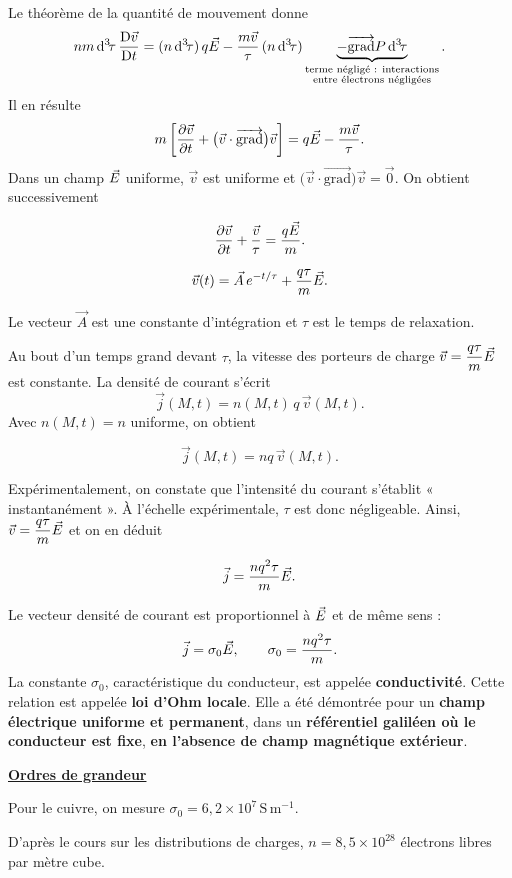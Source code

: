 \documentclass[11pt,a4paper]{article}
\newif\ifinexample
\newcommand{\dd}{\mathrm d}
\newcommand{\vv}{\vec v}
\newcommand{\grad}{\overrightarrow{\mathrm{grad}}}
\newcommand{\titr}[1]{\par\ifinexample\else\Needspace{4\baselineskip}\fi\textbf{\underline{#1}}\par\nopagebreak[3]}
\newcommand{\stars}[1]{\mathord{\star}\ifnum#1>1\mkern5mu\mathord{\star}\fi\ifnum#1>2\mkern5mu\mathord{\star}\fi\ifnum#1>3\mkern5mu\mathord{\star}\fi\ifnum#1>4\mkern5mu\mathord{\star}\fi\ifnum#1>5\mkern5mu\mathord{\star}\fi}
\newenvironment{result}[1][4]{\begin{cadre}[etoiles={\stars{#1}}]}{\end{cadre}}
\newcommand{\vj}{\vec j}\newcommand{\vE}{\vec E}\newcommand{\vB}{\vec B}
\newcommand{\vzero}{\vec 0}
\newcommand{\vol}{\dd^3\!\tau}
\newcommand{\bmath}[1]{\begin{cadre}\[#1\]\end{cadre}}
\newcommand{\unite}[1]{\,\mathrm{#1}}
\begin{document}
Le théorème de la quantité de mouvement donne
\[
 nm\,\vol\,\frac{\mathrm D\vv}{\mathrm Dt}
   =(n\,\vol)\,q\E-\frac{m\vv}{\tau}\,(n\,\vol)
     \underbrace{-\grad P\,\vol}_{\substack{\text{terme négligé : interactions}\\
                                             \text{entre électrons négligées}}}.
\]
Il en résulte
\[
 m\left[\frac{\partial\vv}{\partial t}+
       \bigl(\vv\cdot\grad\bigr)\vv\right]
    =q\E-\frac{m\vv}{\tau}.
\]
Dans un champ \(\vec E\) uniforme, \(\vv\) est uniforme et
\(\bigl(\vv\cdot\grad\bigr)\vv=\vzero\). On obtient successivement
\begin{cadre}\[\frac{\partial\vv}{\partial t}+\frac{\vv}{\tau}=\frac{q\E}{m}.\]\end{cadre}
\begin{cadre}\[\vv(t)=\vec A\,e^{-t/\tau}+\frac{q\tau}{m}\E.\]\end{cadre}
Le vecteur \(\vec A\) est une constante d'intégration et \(\tau\) est le temps de relaxation.

Au bout d'un temps grand devant \(\tau\), la vitesse des porteurs de charge
\(\displaystyle\vv=\frac{q\tau}{m}\E\) est constante. La densité de courant s'écrit
\[
 \vj(M,t)=n(M,t)\,q\,\vv(M,t).
\]
Avec \(n(M,t)=n\) uniforme, on obtient
\bmath{\vj(M,t)=nq\,\vv(M,t).}
Expérimentalement, on constate que l'intensité du courant s'établit « instantanément ».
À l'échelle expérimentale, \(\tau\) est donc négligeable.
Ainsi, \(\displaystyle\vv=\frac{q\tau}{m}\E\) et on en déduit
\bmath{\vj=\frac{nq^2\tau}{m}\E.}

\begin{result}[5]
Le vecteur densité de courant est proportionnel à \(\vec E\) et de même sens :
\[
 \vj=\sigma_0\E,\qquad \sigma_0=\frac{nq^2\tau}{m}.
\]
La constante \(\sigma_0\), caractéristique du conducteur, est appelée \textbf{conductivité}.
Cette relation est appelée \textbf{loi d'Ohm locale}. Elle a été démontrée pour un
\textbf{champ électrique uniforme et permanent}, dans un \textbf{référentiel galiléen où le
conducteur est fixe}, \textbf{en l'absence de champ magnétique extérieur}.
\end{result}

\titr{Ordres de grandeur}
\begin{result}[5]Pour le cuivre, on mesure \(\displaystyle\sigma_0=6{,}2\times10^7\unite{S\,m^{-1}}\).\end{result}
D'après le cours sur les distributions de charges, \(n=8{,}5\times10^{28}\) électrons libres par mètre cube.
\end{document}
